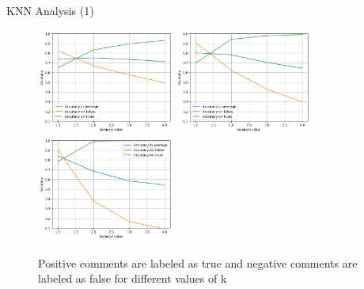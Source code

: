 \documentclass{beamer}
\begin{document}
\begin{frame}{KNN Analysis (1)}
    
\begin{figure}[h]
    \centering
    \includegraphics[width=0.4\textwidth]{balancek5.png}
    \hspace{0.5cm}
    \includegraphics[width=0.4\textwidth]{balancek50.png}
    \vspace{0.5cm}
    \includegraphics[width=0.4\textwidth]{balancek500.png}
    \caption{Positive comments are labeled as true and negative comments are labeled as false for different values of k}
    \label{fig:balancenk}
\end{figure}

\end{frame}
\end{document}
